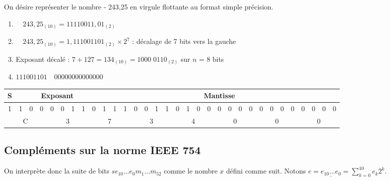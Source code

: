 \begin{exemple}
On désire représenter le nombre - 243,25 en virgule flottante au format simple précision.

\begin{enumerate}
\item $\quad 243,25_{(10)} =  11110011,01_{(2)}$
\item $\quad 243,25_{(10)} =  1,111001101_{(2)} \times  2^7$ : décalage de 7 bits vers la gauche
\item Exposant décalé : $7 + 127 = 134_{(10)} = 1000\; 0110_{(2)}$ 	sur $n$ = 8 bits
\item $111001101\quad 00000000000000$
\end{enumerate}
\end{exemple}


\footnotesize{
\begin{table*}[!h]
\centering
\begin{tabular}{|c|c|c|c|c|c|c|c|c|c|c|c|c|c|c|c|c|c|c|c|c|c|c|c|c|c|c|c|c|c|c|c|}
\hline
S & \multicolumn{8}{c|}{Exposant} & \multicolumn{23}{c|}{Mantisse} \\
\hline
1 & 1 & 0 & 0 & 0 & 0 & 1 & 1 & 0 & 1 & 1 & 1 & 0 & 0 & 1 & 1 & 
0 & 1 & 0 & 0 & 0 & 0 & 0 & 0 & 0 & 0 & 0 & 0 & 0 & 0 & 0 & 0 \\
\hline
\multicolumn{4}{|c|}{C} & \multicolumn{4}{c|}{3} & \multicolumn{4}{c|}{7} & 
\multicolumn{4}{|c|}{3} & \multicolumn{4}{|c|}{4} & \multicolumn{4}{c|}{0} & 
\multicolumn{4}{c|}{0} & \multicolumn{4}{|c|}{0} \\
\hline
\end{tabular}
\end{table*}}

\normalsize

\subsection{Compléments sur la norme IEEE 754}


On interprète donc la suite de bits $se_{10}\ldots e_{0}m_{1}\ldots m_{52}$ comme le nombre $x$ défini comme suit. 
Notons $\displaystyle e  = \underline{e_{10}\ldots e_{0}} = \sum_{k=0}^{10} e_k2^k$. 

